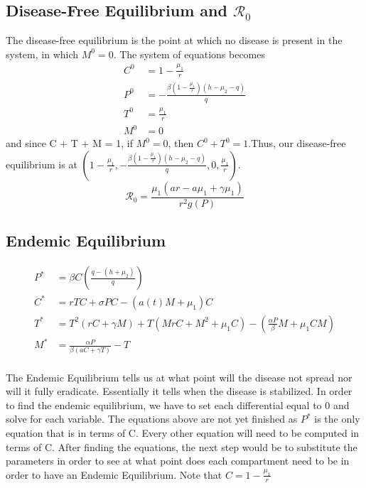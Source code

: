 \documentclass[12pt]{article}
\begin{document}
\subsection{Disease-Free Equilibrium and $\mathscr{R}_{0}$}
The disease-free equilibrium is the point at which no disease is present in the system, in which $M^{0} = 0$. The system of equations becomes
\begin{align*}
        C^{0} &= 1 - \frac{\mu_{1}}{r}\\
        P^{0} &= -\frac{\beta(1 - \frac{\mu_{1}}{r})(h - \mu_{2} - q)}{q}\\
        T^{0} &= \frac{\mu_{1}}{r}\\
        M^{0} &= 0 
\end{align*}
and since C + T + M = 1, if $M^{0} = 0$, then $C^{0} + T^{0} = 1$.Thus, our disease-free equilibrium is at $(1 - \frac{\mu_{1}}{r}, -\frac{\beta(1 - \frac{\mu_{1}}{r})(h - \mu_{2} - q)}{q}, 0, \frac{\mu_{1}}{r})$.
$$\displaystyle {\mathscr{R}}_{0} = \frac{\mu_{1}(a r - a\mu_{1} + \gamma \mu_{1})}{r^{2}g(P)}$$

\subsection{Endemic Equilibrium}
\begin{align*}
        P^{*} &= \beta C \left(\frac{q-(h+\mu_{2})}{q}\right)\\
        C^{*} &= rTC + \sigma PC - (a(t)M+\mu_{1})C\\
        T^{*} &= T^{2}(rC+\gamma M) + T(MrC + M^{2} + \mu_{1}C) - \left(\frac{\alpha P}{\beta}M + \mu_{1} CM\right)\\
        M^{*} &= \frac{\alpha P}{\beta (aC + \gamma T)} - T\\
\end{align*}

The Endemic Equilibrium tells us at what point will the disease not spread nor will it fully eradicate. Essentially it tells when the disease is stabilized. In order to find the endemic equilibrium, we have to set each differential equal to 0 and solve for each variable. The equations above are not yet finished as $P^{*}$ is the only equation that is in terms of C. Every other equation will need to be computed in terms of C. After finding the equations, the next step would be to substitute the parameters in order to see at what point does each compartment need to be in order to have an Endemic Equilibrium. Note that $C=1-\frac{\mu_{1}}{r}$ 
\end{document}
